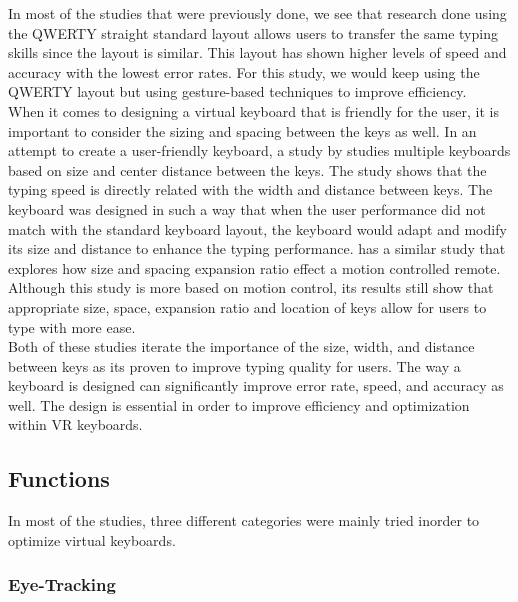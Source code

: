 \documentclass{vgtc}                          %
\begin{document}
In most of the studies that were previously done, we see that research done using the QWERTY straight standard layout allows users to transfer the same typing skills since the layout is similar\cite{Mackenzie:2015}. This layout has shown higher levels of speed and accuracy with the lowest error rates. For this study, we would keep using the QWERTY layout but using gesture-based techniques to improve efficiency.\\[1em]
When it comes to designing a virtual keyboard that is friendly for the user, it is important to consider the sizing and spacing between the keys as well. In an attempt to create a user-friendly keyboard, a study by\cite{10} studies multiple keyboards based on size and center distance between the keys. The study shows that the typing speed is directly related with the width and distance between keys. The keyboard was designed in such a way that when the user performance did not match with the standard keyboard layout, the keyboard would adapt and modify its size and distance to enhance the typing performance\cite{10}.\cite{34} has a similar study that explores how size and spacing expansion ratio effect a motion controlled remote. Although this study is more based on motion control, its results still show that appropriate size, space, expansion ratio and location of keys allow for users to type with more ease\cite{34}.\\[1em]
Both of these studies iterate the importance of the size, width, and distance between keys as its proven to improve typing quality for users. The way a keyboard is designed can significantly improve error rate, speed, and accuracy as well. The design is essential in order to improve efficiency and optimization within VR keyboards. 
\subsection{Functions}

In most of the studies, three different categories were mainly tried inorder to optimize virtual keyboards.
\subsubsection{Eye-Tracking}
\end{document}
